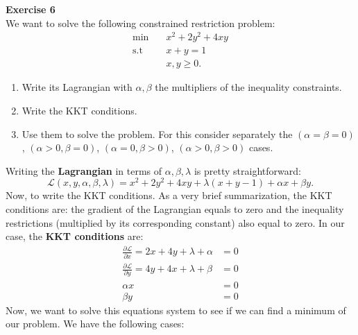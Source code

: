 \documentclass[11pt,table]{article}
\newenvironment{problem}[2][Exercise]
{ \begin{mdframed}[backgroundcolor=gray!20] \textbf{#1 #2} \\}
	{  \end{mdframed}}
\begin{document}
	\begin{problem}{6}
		We want to solve the following constrained restriction problem:
		\begin{align*}
			\min \quad       & x^{2} + 2y^{2} + 4xy \\
			\text{s.t} \quad & x + y = 1            \\
			& x,y \geq 0.
		\end{align*}
		\begin{enumerate}
			\item Write its Lagrangian with \(\alpha,\beta\) the multipliers of the inequality constraints.
			\item Write the KKT conditions.
			\item Use them to solve the problem. For this consider separately the \((\alpha = \beta = 0)\), \((\alpha > 0, \beta = 0)\), \((\alpha = 0, \beta > 0)\), \((\alpha > 0, \beta > 0)\) cases.
		\end{enumerate}
	\end{problem}
	
	Writing the \textbf{Lagrangian} in terms of \(\alpha,\beta,\lambda\) is pretty straightforward:
	\[
	\mathcal L(x,y,\alpha,\beta,\lambda) = x^{2} + 2y^{2} + 4xy + \lambda(x+y - 1) + \alpha x + \beta y .
	\]
	Now, to write the KKT conditions. As a very brief summarization, the KKT conditions are: the gradient of the Lagrangian equals to zero and the inequality restrictions (multiplied by its corresponding constant) also equal to zero. In our case, the \textbf{KKT conditions} are:
	\begin{align*}
		\frac{\partial \mathcal L}{\partial x}  = 2x + 4y + \lambda + \alpha & = 0 \\
		\frac{\partial \mathcal L}{\partial y}  = 4y + 4x + \lambda + \beta  & = 0 \\
		\alpha x                                                    & = 0 \\
		\beta y                                                     & = 0
	\end{align*}
	Now, we want to solve this equations system to see if we can find a minimum of our problem. We have the following cases:
	
\end{document}
